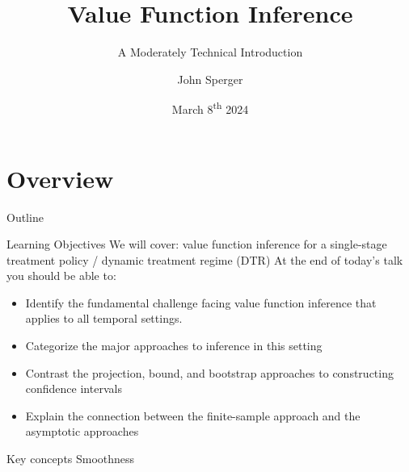 \documentclass[aspectratio=169, professionalfonts]{beamer}
\author{John Sperger}
\date{March 8\textsuperscript{th} 2024}
\title{Value Function Inference}
\subtitle{A Moderately Technical Introduction}
\begin{document}
\maketitle

\section{Overview}
\begin{frame}{Outline}
	\tableofcontents[hideallsubsections]
\end{frame}
\begin{frame}[label={overview:objectives}]{Learning Objectives}
	We will cover: value function inference for a single-stage treatment policy /
	dynamic treatment regime (DTR)
	\vfill \pause
	At the end of today's talk you should be able to:
	\begin{itemize}
		\item Identify the fundamental challenge facing value function inference
		      that applies to all temporal settings.
\vfill \pause


\item Categorize the major approaches to inference in this setting

\vfill \pause

		\item Contrast the projection, bound, and bootstrap approaches to constructing confidence intervals
\vfill \pause

		\item Explain the connection between the finite-sample approach and the
asymptotic approaches
	\end{itemize}
	\vfill
\end{frame}

\begin{frame}{Key concepts}
    Smoothness
    \end{frame}
\end{document}
